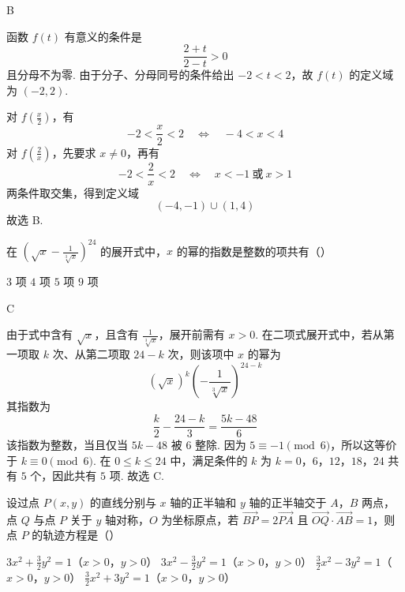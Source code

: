 \begin{answer}
B
\end{answer}

\begin{solution}
函数 \(f(t)\) 有意义的条件是
\[
\frac{2+t}{2-t}>0
\]
且分母不为零. 由于分子、分母同号的条件给出 \(-2<t<2\)，故 \(f(t)\) 的定义域为 \((-2,2)\).

对 \(f(\frac{x}{2})\)，有
\[
-2<\frac{x}{2}<2\quad\Longleftrightarrow\quad -4<x<4
\]
对 \(f(\frac{2}{x})\)，先要求 \(x\ne0\)，再有
\[
-2<\frac{2}{x}<2
\quad\Longleftrightarrow\quad x<-1\ \text{或}\ x>1
\]
两条件取交集，得到定义域
\[
(-4,-1)\cup(1,4)
\]
故选 B.
\end{solution}

\begin{problem}
在 \(\left(\sqrt{x} - \frac{1}{\sqrt[3]{x}}\right)^{24}\) 的展开式中，\(x\) 的幂的指数是整数的项共有（\quad）

\choices
    {\(3\) 项}
    {\(4\) 项}
    {\(5\) 项}
    {\(9\) 项}
\end{problem}

\begin{answer}
C
\end{answer}

\begin{solution}
由于式中含有 \(\sqrt{x}\)，且含有 \(\frac1{\sqrt[3]{x}}\)，展开前需有 \(x>0\). 在二项式展开式中，若从第一项取 \(k\) 次、从第二项取 \(24-k\) 次，则该项中 \(x\) 的幂为
\[
\left(\sqrt{x}\right)^k\left(-\frac1{\sqrt[3]{x}}\right)^{24-k}
\]
其指数为
\[
\frac{k}{2}-\frac{24-k}{3}=\frac{5k-48}{6}
\]
该指数为整数，当且仅当 \(5k-48\) 被 \(6\) 整除. 因为 \(5\equiv-1\pmod 6\)，所以这等价于 \(k\equiv0\pmod6\). 在 \(0\leqslant k\leqslant24\) 中，满足条件的 \(k\) 为
\(k=0\)，\(6\)，\(12\)，\(18\)，\(24\)
共有 \(5\) 个，因此共有 \(5\) 项. 故选 C.
\end{solution}

\begin{problem}
设过点 \(P(x, y)\) 的直线分别与 \(x\) 轴的正半轴和 \(y\) 轴的正半轴交于 \(A\)，\(B\) 两点，点 \(Q\) 与点 \(P\) 关于 \(y\) 轴对称，\(O\) 为坐标原点，若 \(\overrightarrow{BP} = 2\overrightarrow{PA}\) 且 \(\overrightarrow{OQ} \cdot \overrightarrow{AB} = 1\)，则点 \(P\) 的轨迹方程是（\quad）

\choices
    {\(3x^{2} + \frac{3}{2} y^{2} = 1\)（\(x > 0\)，\(y > 0\)）}
    {\(3x^{2} - \frac{3}{2} y^{2} = 1\)（\(x > 0\)，\(y > 0\)）}
    {\(\frac{3}{2} x^2 - 3y^2 = 1\)（\(x > 0\)，\(y > 0\)）}
    {\(\frac{3}{2} x^2 + 3y^2 = 1\)（\(x > 0\)，\(y > 0\)）}
\end{problem}


